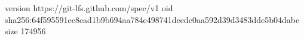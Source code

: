 version https://git-lfs.github.com/spec/v1
oid sha256:64f595591ec8ead1b9b694aa784e498741deede0aa592d39d3483dde5b04dabe
size 174956
